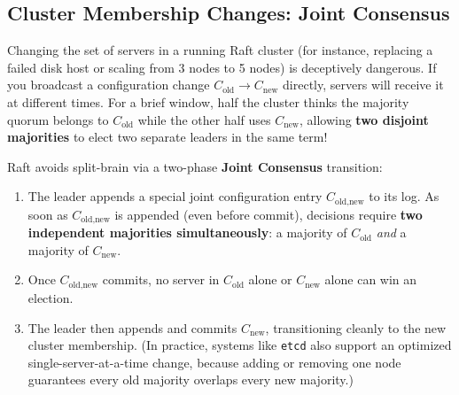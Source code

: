 \subsection{Cluster Membership Changes: Joint Consensus}

Changing the set of servers in a running Raft cluster (for instance, replacing a failed disk host or scaling from 3 nodes to 5 nodes) is deceptively dangerous. If you broadcast a configuration change $C_{\text{old}} \to C_{\text{new}}$ directly, servers will receive it at different times. For a brief window, half the cluster thinks the majority quorum belongs to $C_{\text{old}}$ while the other half uses $C_{\text{new}}$, allowing \textbf{two disjoint majorities} to elect two separate leaders in the same term!

Raft avoids split-brain via a two-phase \textbf{Joint Consensus} transition:
\begin{enumerate}[leftmargin=18pt]
  \item The leader appends a special joint configuration entry $C_{\text{old,new}}$ to its log. As soon as $C_{\text{old,new}}$ is appended (even before commit), decisions require \textbf{two independent majorities simultaneously}: a majority of $C_{\text{old}}$ \emph{and} a majority of $C_{\text{new}}$.
  \item Once $C_{\text{old,new}}$ commits, no server in $C_{\text{old}}$ alone or $C_{\text{new}}$ alone can win an election.
  \item The leader then appends and commits $C_{\text{new}}$, transitioning cleanly to the new cluster membership. (In practice, systems like \texttt{etcd} also support an optimized single-server-at-a-time change, because adding or removing one node guarantees every old majority overlaps every new majority.)
\end{enumerate}

